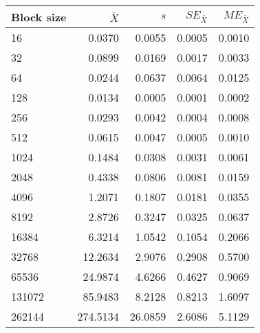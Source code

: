 \begin{tabular}{lrrrr}\toprule
{\small Block size} & $\bar{X}$ & $s$ & $SE_{\bar{X}}$ & $ME_{\bar{X}}$ \\\midrule
16 & 0.0370 & 0.0055 & 0.0005 & 0.0010\\
32 & 0.0899 & 0.0169 & 0.0017 & 0.0033\\
64 & 0.0244 & 0.0637 & 0.0064 & 0.0125\\
128 & 0.0134 & 0.0005 & 0.0001 & 0.0002\\
256 & 0.0293 & 0.0042 & 0.0004 & 0.0008\\
512 & 0.0615 & 0.0047 & 0.0005 & 0.0010\\
1024 & 0.1484 & 0.0308 & 0.0031 & 0.0061\\
2048 & 0.4338 & 0.0806 & 0.0081 & 0.0159\\
4096 & 1.2071 & 0.1807 & 0.0181 & 0.0355\\
8192 & 2.8726 & 0.3247 & 0.0325 & 0.0637\\
16384 & 6.3214 & 1.0542 & 0.1054 & 0.2066\\
32768 & 12.2634 & 2.9076 & 0.2908 & 0.5700\\
65536 & 24.9874 & 4.6266 & 0.4627 & 0.9069\\
131072 & 85.9483 & 8.2128 & 0.8213 & 1.6097\\
262144 & 274.5134 & 26.0859 & 2.6086 & 5.1129\\
\bottomrule
\end{tabular}
